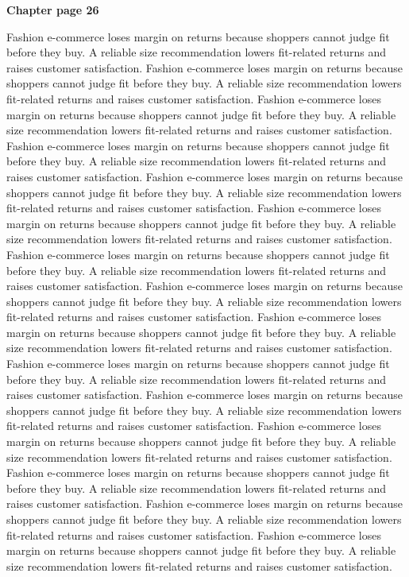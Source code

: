 \documentclass[a4paper,11pt]{article}
\begin{document}
{\headfont\bfseries\Large Chapter page 26}\par\medskip
Fashion e-commerce loses margin on returns because shoppers cannot judge fit before they buy. A reliable size recommendation lowers fit-related returns and raises customer satisfaction. Fashion e-commerce loses margin on returns because shoppers cannot judge fit before they buy. A reliable size recommendation lowers fit-related returns and raises customer satisfaction. Fashion e-commerce loses margin on returns because shoppers cannot judge fit before they buy. A reliable size recommendation lowers fit-related returns and raises customer satisfaction. Fashion e-commerce loses margin on returns because shoppers cannot judge fit before they buy. A reliable size recommendation lowers fit-related returns and raises customer satisfaction. Fashion e-commerce loses margin on returns because shoppers cannot judge fit before they buy. A reliable size recommendation lowers fit-related returns and raises customer satisfaction. 
Fashion e-commerce loses margin on returns because shoppers cannot judge fit before they buy. A reliable size recommendation lowers fit-related returns and raises customer satisfaction. Fashion e-commerce loses margin on returns because shoppers cannot judge fit before they buy. A reliable size recommendation lowers fit-related returns and raises customer satisfaction. Fashion e-commerce loses margin on returns because shoppers cannot judge fit before they buy. A reliable size recommendation lowers fit-related returns and raises customer satisfaction. Fashion e-commerce loses margin on returns because shoppers cannot judge fit before they buy. A reliable size recommendation lowers fit-related returns and raises customer satisfaction. Fashion e-commerce loses margin on returns because shoppers cannot judge fit before they buy. A reliable size recommendation lowers fit-related returns and raises customer satisfaction. 
Fashion e-commerce loses margin on returns because shoppers cannot judge fit before they buy. A reliable size recommendation lowers fit-related returns and raises customer satisfaction. Fashion e-commerce loses margin on returns because shoppers cannot judge fit before they buy. A reliable size recommendation lowers fit-related returns and raises customer satisfaction. Fashion e-commerce loses margin on returns because shoppers cannot judge fit before they buy. A reliable size recommendation lowers fit-related returns and raises customer satisfaction. Fashion e-commerce loses margin on returns because shoppers cannot judge fit before they buy. A reliable size recommendation lowers fit-related returns and raises customer satisfaction. Fashion e-commerce loses margin on returns because shoppers cannot judge fit before they buy. A reliable size recommendation lowers fit-related returns and raises customer satisfaction. \newpage
\end{document}
